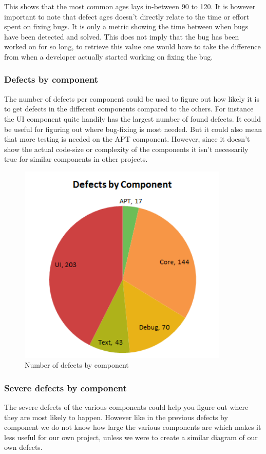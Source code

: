 \documentclass{article}
\begin{document}
This shows that the most common ages lays in-between 90 to 120.
It is however important to note that defect ages doesn't directly relate to the time or effort spent on fixing bugs.
It is only a metric showing the time between when bugs have been detected and solved.
This does not imply that the bug has been worked on for so long, to retrieve this value one would have to take the difference from when a developer actually started working on fixing the bug.

\subsubsection{Defects by component}
The number of defects per component could be used to figure out how likely it is to get defects in the different components compared to the others.
For instance the UI component quite handily has the largest number of found defects. It could be useful for figuring out where bug-fixing is most needed. But it could also mean that more testing is needed on the APT component.
However, since it doesn't show the actual code-size or complexity of the components it isn't necessarily true for similar components in other projects.
\begin{figure}[H]
\center
\includegraphics[width=100mm]{defects_by_component.png}
\caption{Number of defects by component}
\end{figure}

\subsubsection{Severe defects by component}
The severe defects of the various components could help you figure out where they are most likely to happen.
However like in the previous defects by component we do not know how large the various components are which makes it less useful for our own project, unless we were to create a similar diagram of our own defects.
\end{document}

